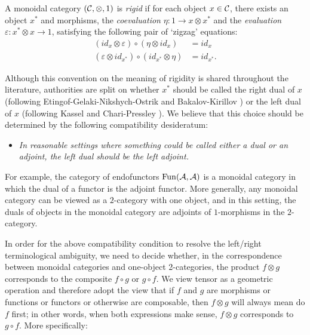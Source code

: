 \documentclass{amsart}
\begin{document}
\begin{definition} \label{def:rigid}
	A monoidal category $(\mathcal C, \otimes, 1)$ is {\em rigid} if for each object $x \in \mathcal C$, there exists an object $x^*$ and morphisms, the {\em coevaluation} $\eta: 1 \to x \otimes x^*$ and the {\em evaluation} $\varepsilon: x^* \otimes x \to 1$, satisfying the following pair of `zigzag' equations:
	\begin{align*}
		(id_{x} \otimes \varepsilon  ) \circ (  \eta \otimes id_{x}) &= id_{x} \\
		(\varepsilon \otimes id_{x^*}) \circ (id_{x^*} \otimes \eta) &= id_{x^*}.
	\end{align*}
\end{definition}

Although this convention on the meaning of rigidity is shared throughout the literature, authorities are split on whether $x^*$ should be called the right dual of $x$ (following Etingof-Gelaki-Nikshych-Ostrik \cite{EGNO} and Bakalov-Kirillov \cite{MR1797619})  or the left dual of $x$ (following Kassel \cite{MR1470954} and Chari-Pressley \cite{MR1358358}).  We believe that this choice should be determined by the following compatibility desideratum: 
\begin{itemize}
\item[]
	\emph{In reasonable settings where something could be called either a dual or an adjoint, the left dual should be the left adjoint.}
\end{itemize}

\nid For example, the category of endofunctors $\operatorname{Fun}(\mathcal A, \mathcal A)$ is a monoidal category in which the dual of a functor is the adjoint functor.  More generally, any monoidal category can be viewed as a $2$-category with one object, and in this setting, the duals of objects in the monoidal category are adjoints of $1$-morphisms in the $2$-category.  

In order for the above compatibility condition to resolve the left/right terminological ambiguity, we need to decide whether, in the correspondence between monoidal categories and one-object 2-categories, the product $f \otimes g$ corresponds to the composite $f \circ g$ or $g \circ f$.  We view tensor as a geometric operation and therefore adopt the view that if $f$ and $g$ are morphisms or functions or functors or otherwise are composable, then $f \otimes g$ will always mean do $f$ first; in other words, when both expressions make sense, $f \otimes g$ corresponds to $g \circ f$.  More specifically:
\end{document}

